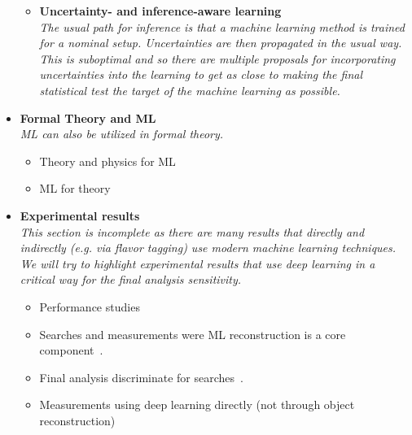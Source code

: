 \documentclass[12pt,letterpaper]{article}
\begin{document}
\begin{itemize}
\begin{itemize}
		\item \textbf{Uncertainty- and inference-aware learning}~\cite{Caron:2019xkx,Bollweg:2019skg,deCastro:2018mgh,Wunsch:2020iuh,Ghosh:2021roe,Abudinen:2021qpc,Simpson:2022suz,Layer:2023lwi}
		\\\textit{The usual path for inference is that a machine learning method is trained for a nominal setup.  Uncertainties are then propagated in the usual way.  This is suboptimal and so there  are multiple proposals for incorporating uncertainties into the learning to get as close to making the final statistical test the target of the machine learning as possible.}
              \end{itemize}
\item \textbf{Formal Theory and ML}
\\\textit{ML can also be utilized in formal theory.}
        \begin{itemize}
        \item Theory and physics for ML~\cite{Erbin:2022lls,Zuniga-Galindo:2023hty,Banta:2023kqe,Zuniga-Galindo:2023uwp,Kumar:2023hlu,Demirtas:2023fir,Halverson:2023ndu}
        \item ML for theory~\cite{Berglund:2022gvm,Erbin:2022rgx,Gerdes:2022nzr,Escalante-Notario:2022fik,Chen:2022jwd,Cheung:2022itk,He:2023csq,Lal:2023dkj,Dorrill:2023vox,Forestano:2023ijh,Dersy:2023job,Cotler:2023lem,Mizera:2023bsw,Gnech:2023prs,Seong:2023njx,Wojcik:2023usm,Alawadhi:2023gxa,Choi:2023rqg,Halverson:2023ndu,Matchev:2023mii}
        \end{itemize}
\item \textbf{Experimental results}
\\\textit{This section is incomplete as there are many results that directly and indirectly (e.g. via flavor tagging) use modern machine learning techniques.  We will try to highlight experimental results that use deep learning in a critical way for the final analysis sensitivity.}
	\begin{itemize}
		\item Performance studies~\cite{CMS:2022prd,Yang:2022dwu,NEOS-II:2022mov,Jiang:2022zho,Gronroos:2023qff}
		\item Searches and measurements were ML reconstruction is a core component~\cite{Keck:2018lcd,CMS:2019dqq,MicroBooNE:2021nxr,MicroBooNE:2021jwr,ATLAS:2022ihe,CMS:2022idi,CMS:2022fxs,Li:2022gpb,Tran:2022ago,Manganelli:2022whv,CMS:2022wjc,ATLAS:2023mcc,ATLAS:2023hbp,ATLAS:2023vxg,ATLAS:2023qdu,ATLAS:2023bzb,ATLAS:2023sbu,ATLAS:2023dnm,NOvA:2023uxq,Gravili:2023hbp,Dutta:2023jbz,Belfkir:2023vpo,Tung:2023lkv,Akar:2023puf,BOREXINO:2023pcv}.
		\item Final analysis discriminate for searches~\cite{Aad:2019yxi,Aad:2020hzm,collaboration2020dijet,Sirunyan:2020hwz,Manganelli:2022whv}.
		\item Measurements using deep learning directly (not through object reconstruction)~\cite{H1:2021wkz,H1:2023fzk}
	\end{itemize}


\end{itemize}


\clearpage
\flushbottom
%


\end{document}
